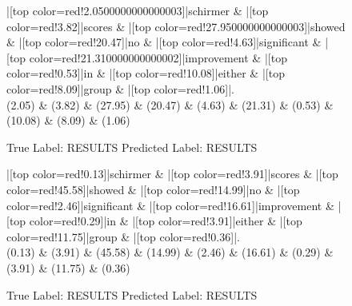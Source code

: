 \documentclass[a4paper, landscape]{article}
\begin{document}
\begin{figure}
\begin{center}
\begin{dependency}
\begin{deptext}
|[top color=red!2.0500000000000003]|schirmer \& |[top color=red!3.82]|scores \& |[top color=red!27.950000000000003]|showed \& |[top color=red!20.47]|no \& |[top color=red!4.63]|significant \& |[top color=red!21.310000000000002]|improvement \& |[top color=red!0.53]|in \& |[top color=red!10.08]|either \& |[top color=red!8.09]|group \& |[top color=red!1.06]|.\\
(2.05) \& (3.82) \& (27.95) \& (20.47) \& (4.63) \& (21.31) \& (0.53) \& (10.08) \& (8.09) \& (1.06)\\
\end{deptext}
\end{dependency}
\end{center}
\caption{True Label: RESULTS Predicted Label: RESULTS}
\end{figure}
\clearpage
\begin{figure}
\begin{center}
\begin{dependency}
\begin{deptext}
|[top color=red!0.13]|schirmer \& |[top color=red!3.91]|scores \& |[top color=red!45.58]|showed \& |[top color=red!14.99]|no \& |[top color=red!2.46]|significant \& |[top color=red!16.61]|improvement \& |[top color=red!0.29]|in \& |[top color=red!3.91]|either \& |[top color=red!11.75]|group \& |[top color=red!0.36]|.\\
(0.13) \& (3.91) \& (45.58) \& (14.99) \& (2.46) \& (16.61) \& (0.29) \& (3.91) \& (11.75) \& (0.36)\\
\end{deptext}
\end{dependency}
\end{center}
\caption{True Label: RESULTS Predicted Label: RESULTS}
\end{figure}
\end{document}
